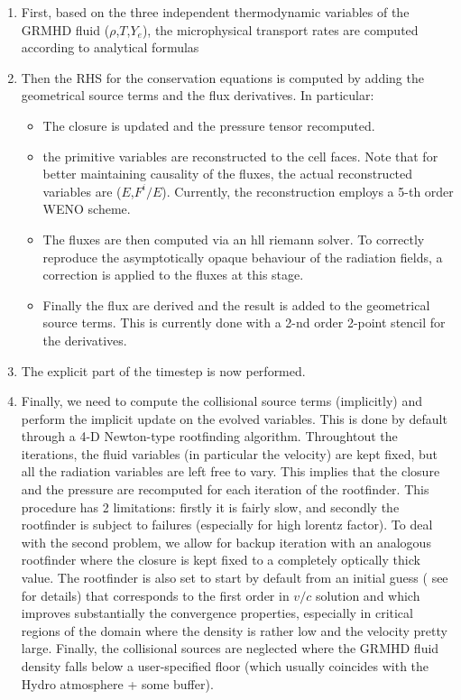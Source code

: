 \begin{enumerate}
\item First, based on the three independent thermodynamic variables of the GRMHD fluid ($\rho$,$T$,$Y_e$), the microphysical transport rates are computed according to analytical formulas
\item Then the RHS for the conservation equations is computed by adding the geometrical source terms and the flux derivatives. In particular:
  \begin{itemize}
  \item The closure is updated and the pressure tensor recomputed.
  \item the primitive variables are reconstructed to the cell faces. Note that for better maintaining causality of the fluxes, the actual reconstructed variables are ($E$,$F^i/E$). Currently, the reconstruction employs a 5-th order WENO scheme.
  \item The fluxes are then computed via an hll riemann solver. To correctly reproduce the asymptotically opaque behaviour of the radiation fields, a correction is applied to the fluxes at this stage.
  \item Finally the flux are derived and the result is added to the geometrical source terms. This is currently done with a 2-nd order 2-point stencil for the derivatives.
  \end{itemize}
\item The explicit part of the timestep is now performed.
\item Finally, we need to compute the collisional source terms (implicitly) and perform the implicit update on the evolved variables. This is done by default through a 4-D Newton-type rootfinding algorithm. Throughtout the iterations, the fluid variables (in particular the velocity) are kept fixed, but all the radiation variables are left free to vary. This implies that the closure and the pressure are recomputed for each iteration of the rootfinder. This procedure has 2 limitations: firstly it is fairly slow, and secondly the rootfinder is subject to failures (especially for high lorentz factor).  To deal with the second problem, we allow for backup iteration with an analogous rootfinder where the closure is kept fixed to a completely optically thick value. The rootfinder is also set to start by default from an initial guess ( see \cite{FILM1_FIL_M1_RadiceM1} for details) that corresponds to  the first order in $v/c$ solution and which improves substantially the convergence properties, especially in critical regions of the domain where the density is rather low and the velocity pretty large. Finally, the collisional sources are neglected where the GRMHD fluid density falls below a user-specified floor (which usually coincides with the Hydro atmosphere + some buffer). 
\end{enumerate}

